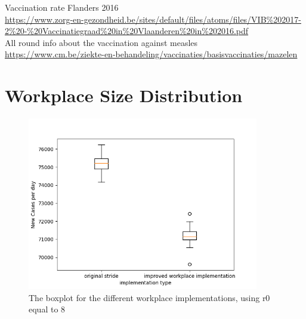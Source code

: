 \documentclass[runningheads]{llncs}
\begin{document}
\begin{thebibliography}{20}
		Vaccination rate Flanders 2016 \\
		\url{https://www.zorg-en-gezondheid.be/sites/default/files/atoms/files/VIB\%202017-2\%20-\%20Vaccinatiegraad\%20in\%20Vlaanderen\%20in\%202016.pdf}
		\\
		
		All round info about the vaccination against measles \\
		\url{https://www.cm.be/ziekte-en-behandeling/vaccinaties/basisvaccinaties/mazelen}
		
	\end{thebibliography}
	
	
	\appendix
	\appendixpage
	\section{Workplace Size Distribution}
	\begin{figure}
		\centering
		\includegraphics[width=0.9\textwidth]{workplace_r08_boxplot.png}	
		\caption{The boxplot for the different workplace implementations, using r0 equal to 8}
		\label{fig1}
	\end{figure}
\end{document}
